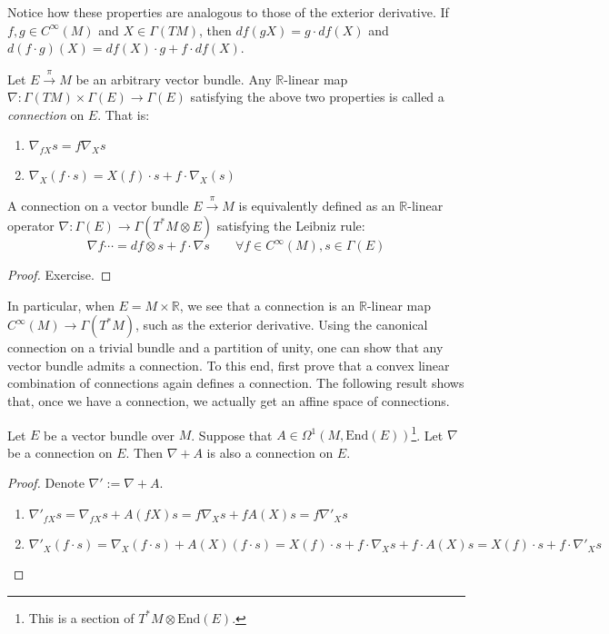 Notice how these properties are analogous to those of the exterior derivative. If $f,g\in C^\infty(M)$ and $X\in\Gamma(TM)$, then $df(gX)=g\cdot df(X)$ and $d(f\cdot g)(X)=df(X)\cdot g+f\cdot df(X)$.
\begin{definition}\label{def:linearConnection}
  Let $E\xrightarrow{\pi}M$ be an arbitrary vector bundle. Any $\mathbb{R}$-linear map $\nabla:\Gamma(TM)\times\Gamma(E)\to\Gamma(E)$ satisfying the above two properties is called a \emph{connection} on $E$. That is:
  \begin{enumerate}
    \item $\nabla_{fX}s=f\nabla_Xs$
    \item $\nabla_X(f\cdot s)=X(f)\cdot s+f\cdot\nabla_X(s)$
  \end{enumerate}
\end{definition}
\begin{proposition}
    A connection on a vector bundle $E\xrightarrow{\pi}M$ is equivalently defined as an $\mathbb{R}$-linear operator $\nabla:\Gamma(E)\to\Gamma(T^*M\otimes E)$ satisfying the Leibniz rule:
    \begin{equation}
        \nabla f\cdots = df\otimes s + f\cdot\nabla s\quad\quad\forall f\in C^\infty(M), s\in\Gamma(E)
    \end{equation}
\end{proposition}
\begin{proof}
    Exercise.
\end{proof}
In particular, when $E=M\times\mathbb{R}$, we see that a connection is an $\mathbb{R}$-linear map $C^\infty(M)\to \Gamma(T^*M)$, such as the exterior derivative. Using the canonical connection on a trivial bundle and a partition of unity, one can show that any vector bundle admits a connection. To this end, first prove that a convex linear combination of connections again defines a connection. The following result shows that, once we have a connection, we actually get an affine space of connections.
\begin{proposition}
  Let $E$ be a vector bundle over $M$. Suppose that $A\in\Omega^1(M, \text{End}(E))$\footnote{This is a section of $T^*M\otimes\text{End}(E)$.}. Let $\nabla$ be a connection on $E$. Then $\nabla + A$ is also a connection on $E$.
\end{proposition}
\begin{proof}
  Denote $\nabla':=\nabla+A$.
  \begin{enumerate}
    \item $\nabla'_{fX}s=\nabla_{fX}s+A(fX)s=f\nabla_Xs+fA(X)s=f\nabla'_Xs$
    \item $\nabla'_X(f\cdot s)=\nabla_X(f\cdot s)+A(X)(f\cdot s)=X(f)\cdot s+f\cdot\nabla_Xs+f\cdot A(X)s=X(f)\cdot s+f\cdot\nabla'_Xs$
  \end{enumerate}
\end{proof}
